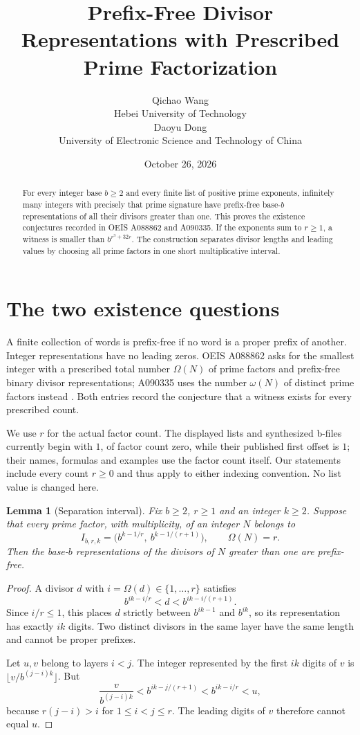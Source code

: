 \documentclass[10pt]{article}
\title{Prefix-Free Divisor Representations with Prescribed Prime Factorization}
\author{Qichao Wang\\{\small Hebei University of Technology}\\[0.3em]
Daoyu Dong\\{\small University of Electronic Science and Technology of China}}
\date{October 26, 2026}
\newtheorem{lemma}{Lemma}
\newcommand{\Om}{\Omega}
\newcommand{\om}{\omega}
\begin{document}
\maketitle
\begin{abstract}
For every integer base $b\ge2$ and every finite list of positive prime
exponents, infinitely many integers with precisely that prime signature
have prefix-free base-$b$ representations of all their divisors greater
than one. This proves the existence conjectures recorded in OEIS A088862
and A090335. If the exponents sum to $r\ge1$, a witness is smaller than
$b^{r^3+32r}$. The construction separates divisor lengths and leading
values by choosing all prime factors in one short multiplicative interval.
\end{abstract}

\section{The two existence questions}
A finite collection of words is prefix-free if no word is a proper prefix
of another. Integer representations have no leading zeros. OEIS A088862
asks for the smallest integer with a prescribed total number $\Om(N)$ of
prime factors and prefix-free binary divisor representations; A090335
uses the number $\om(N)$ of distinct prime factors instead
\cite{a88862,a90335}. Both entries record the conjecture that a witness
exists for every prescribed count.

We use $r$ for the actual factor count. The displayed lists and synthesized
b-files currently begin with $1$, of factor count zero, while their
published first offset is $1$; their names, formulas and examples use the
factor count itself. Our statements include every count $r\ge0$ and thus
apply to either indexing convention. No list value is changed here.

\begin{lemma}[Separation interval]\label{lem:separate}
Fix $b\ge2$, $r\ge1$ and an integer $k\ge2$. Suppose that every prime factor,
with multiplicity, of an integer $N$ belongs to
\begin{equation}\label{eq:interval}
 I_{b,r,k}=\bigl(b^{k-1/r},\ b^{k-1/(r+1)}\bigr),
 \qquad \Om(N)=r.
\end{equation}
Then the base-$b$ representations of the divisors of $N$ greater than one
are prefix-free.
\end{lemma}
\begin{proof}
A divisor $d$ with $i=\Om(d)\in\{1,\ldots,r\}$ satisfies
\begin{equation}\label{eq:layer}
 b^{ik-i/r}<d<b^{ik-i/(r+1)}.
\end{equation}
Since $i/r\le1$, this places $d$ strictly between $b^{ik-1}$ and $b^{ik}$,
so its representation has exactly $ik$ digits. Two distinct divisors in
the same layer have the same length and cannot be proper prefixes.

Let $u,v$ belong to layers $i<j$. The integer represented by the first
$ik$ digits of $v$ is $\lfloor v/b^{(j-i)k}\rfloor$. But
\[
 \frac{v}{b^{(j-i)k}}<b^{ik-j/(r+1)}
 <b^{ik-i/r}<u,
\]
because $r(j-i)>i$ for $1\le i<j\le r$. The leading digits of $v$ therefore
cannot equal $u$.
\end{proof}
\end{document}
